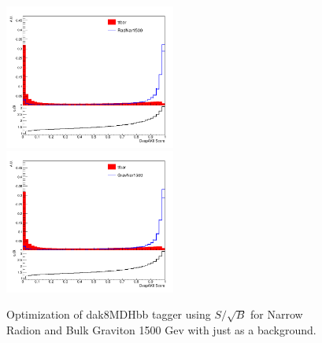 \begin{figure}[!htb]
	\centering
	\includegraphics[width=0.5\textwidth]{Figures/wp_RadNar1500_ttbar.png}
	\includegraphics[width=0.5\textwidth]{Figures/wp_GravNar1500_ttbar.png}
	\caption{Optimization of dak8MDHbb tagger using $S/\sqrt{B}$ for Narrow Radion and Bulk Graviton 1500 Gev with just \ttbar as a background.}
	\label{fig:SoversqrtBstudyttbar}
\end{figure}
\clearpage
